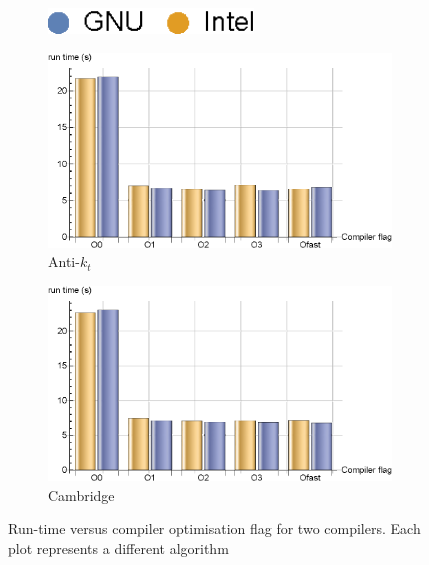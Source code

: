 \begin{figure}[H]
    \centering
        \begin{subfigure}[b]{0.3\textwidth}
        \centering
    \end{subfigure}
    \hfill
    \begin{subfigure}[b]{0.3\textwidth}
        \centering
        \includegraphics[width=0.6\textwidth]{images/flagsleg.eps}
    \end{subfigure}
    \hfill
    \begin{subfigure}[b]{0.3\textwidth}
    \centering
    \end{subfigure}
    
    \begin{subfigure}[b]{0.48\textwidth}
        \centering
        \includegraphics[width=1.2\textwidth]{images/flagskt.eps}
        \caption{Anti-$k_t$}
    \end{subfigure}
    \hfill
    \begin{subfigure}[b]{0.48\textwidth}
        \centering
        \includegraphics[width=1.2\textwidth]{images/flagscam.eps}
        \caption{Cambridge}
    \end{subfigure}
    \hfill
    \caption{Run-time versus compiler optimisation flag for two compilers. Each plot represents a different algorithm}
    \label{fig:flags}
\end{figure}

